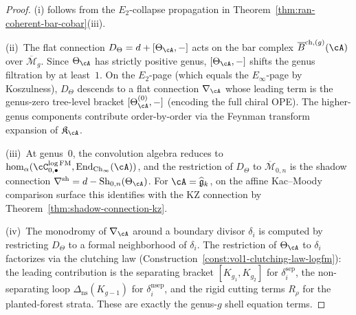 \begin{proof}
(i) follows from the $E_2$-collapse propagation in
Theorem~\ref{thm:ran-coherent-bar-cobar}(iii).

(ii)~The flat connection
$D_\Theta = d + [\Theta_\cA, -]$ acts on
the bar complex $\overline{B}^{\mathrm{ch},(g)}(\cA)$ over
$\overline{\mathcal{M}}_g$.  Since $\Theta_\cA$ has
strictly positive genus,
$[\Theta_\cA, -]$ shifts the genus filtration by at least~$1$.
On the $E_2$-page (which equals the $E_\infty$-page by
Koszulness), $D_\Theta$ descends to a flat connection
$\nabla_\cA$ whose leading term is the genus-zero tree-level
bracket $[\Theta_\cA^{(0)}, -]$ (encoding the full chiral OPE).
The higher-genus components contribute order-by-order via the
Feynman transform expansion of $\mathfrak{K}_\cA$.

(iii)~At genus~$0$, the convolution algebra reduces to
$\operatorname{hom}_\alpha(\cC^{\log\mathrm{FM}}_{0,\bullet},
\operatorname{End}_{\mathrm{Ch}_\infty}(\cA))$, and the
restriction of $D_\Theta$ to
$\overline{\mathcal{M}}_{0,n}$ is the shadow connection
$\nabla^{\mathrm{sh}} = d - \operatorname{Sh}_{0,n}(\Theta_\cA)$.
For $\cA = \widehat{\mathfrak{g}}_k$, on the affine Kac--Moody
comparison surface this identifies with the KZ connection by
Theorem~\ref{thm:shadow-connection-kz}.

(iv)~The monodromy of $\nabla_\cA$ around a boundary divisor
$\delta_i$ is computed by restricting $D_\Theta$
to a formal neighborhood of $\delta_i$.  The restriction of
$\Theta_\cA$ to $\delta_i$ factorizes via the clutching
law (Construction~\ref{const:vol1-clutching-law-logfm}):
the leading contribution is the separating bracket
$[K_{g_1}, K_{g_2}]$ for $\delta_i^{\mathrm{sep}}$, the
non-separating loop $\Delta_{\mathrm{ns}}(K_{g-1})$ for
$\delta_i^{\mathrm{nsep}}$, and the rigid cutting terms
$R_\rho$ for the planted-forest strata.  These are exactly
the genus-$g$ shell equation terms.
\end{proof}


